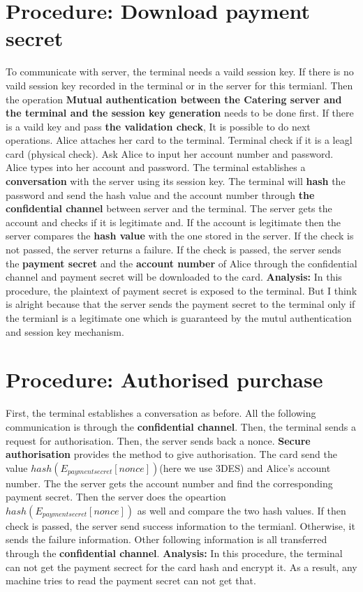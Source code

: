\documentclass{article}
\begin{document}
    \section{Procedure: Download payment secret}
To communicate with server, the terminal needs a vaild session key. 
If there is no vaild session key recorded in the terminal or in the server for this termianl. 
Then the operation \textbf{Mutual authentication between the Catering server and the terminal and the session key generation} needs to be done first. 
If there is a vaild key and pass \textbf{the validation check},
It is possible to do next operations.
        \newline
Alice attaches her card to the terminal. 
Terminal check if it is a leagl card (physical check). 
Ask Alice to input her account number and password. 
Alice types into her account and password. 
The terminal establishes a \textbf{conversation} with the server using its session key.
The terminal will \textbf{hash} the password and send the hash value and the account number through \textbf{the confidential channel} between server and the terminal. 
The server gets the account and checks if it is legitimate and. 
If the account is legitimate then the server compares the \textbf{hash value} with the one stored in the server. 
If the check is not passed, the server returns a failure.
If the check is passed, the server sends the \textbf{payment secret} and the \textbf{account number} of Alice through the confidential channel and payment secret will be downloaded to the card.
        \newline 
\textbf{Analysis:}
        \newline
In this procedure, the plaintext of payment secret is exposed to the terminal. 
But I think is alright because that the server sends the payment secret to the terminal only if the termianl is a legitimate one which is guaranteed by the mutul authentication and session key mechanism.
        \newline

    \section{Procedure: Authorised purchase}
First, the terminal establishes a conversation as before.
All the following communication is through the \textbf{confidential channel}.
Then, the terminal sends a request for authorisation.
Then, the server sends back a nonce. 
\textbf{Secure authorisation} provides the method to give authorisation. 
The card send the value $hash(E_{payment secret}[nonce])$(here we use 3DES) and Alice's account number.
The the server gets the account number and find the corresponding payment secret. 
Then the server does the opeartion $hash(E_{payment secret}[nonce])$ as well and compare the two hash values.
If then check is passed, the server send success information to the termianl. Otherwise, it sends the failure information. 
Other following information is all transferred through the \textbf{confidential channel}.
        \newline
\textbf{Analysis:}
In this procedure, the terminal can not get the payment secrect for the card hash and encrypt it. As a result, any machine tries to read the payment secret can not get that.
\end{document}
